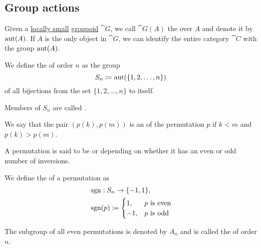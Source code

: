 \subsection{Group actions}\label{subsec:group_actions}

\begin{definition}\label{def:automorphism_group}
  Given a \hyperref[def:category_size]{locally small} \hyperref[def:groupoid]{groupoid} \( \cat{G} \), we call \( \cat{G}(A) \) the  over \( A \) and denote it by \( \operatorname{aut}(A) \). If \( A \) is the only object in \( \cat{G} \), we can identify the entire category \( \cat{C} \) with the group \( \operatorname{aut}(A) \).
\end{definition}

\begin{definition}\label{def:symmetric_group}
  We define the  of order \( n \) as the group
  \begin{equation*}
    S_n \coloneqq \operatorname{aut}(\{ 1, 2, \ldots, n \})
  \end{equation*}
  of all bijections from the set \( \{ 1, 2, \ldots, n \} \) to itself.

  \begin{thmenum}
     Members of \( S_n \) are called .

     We say that the pair \( (p(k), p(m)) \) is an  of the permutation \( p \) if \( k < m \) and \( p(k) > p(m) \).

     A permutation is said to be  or  depending on whether it has an even or odd number of inversions.

     We define the  of a permutation as
    \begin{align*}
       &\operatorname{sgn}: S_n \to \{ -1, 1 \}, \\
       &\operatorname{sgn}(p) \coloneqq \begin{cases}
        1,  &p \text{ is even} \\
        -1, &p \text{ is odd}
      \end{cases}
    \end{align*}

     The subgroup of all even permutations is denoted by \( A_n \) and is called the  of order \( n \).
  \end{thmenum}
\end{definition}

